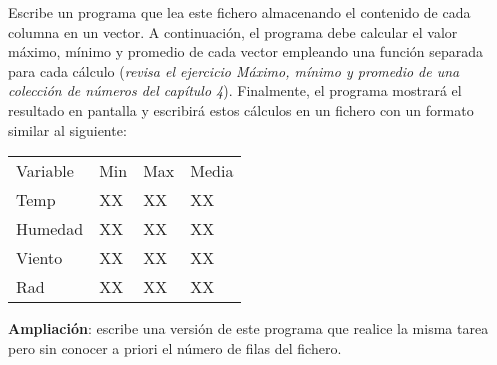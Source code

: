 \documentclass[a4paper]{article}
\begin{document}
Escribe un programa que lea este fichero almacenando el contenido de cada columna en un vector. A continuación, el programa debe calcular el valor máximo, mínimo y promedio de cada vector empleando una función separada para cada cálculo (\emph{revisa el ejercicio \guillemotleft{}Máximo, mínimo y promedio de una colección de números\guillemotright{} del capítulo 4}). Finalmente, el programa mostrará el resultado en pantalla y escribirá estos cálculos en un fichero con un formato similar al siguiente:

\begin{center}
\begin{tabular}{llll}
Variable & Min & Max & Media\\
Temp & XX & XX & XX\\
Humedad & XX & XX & XX\\
Viento & XX & XX & XX\\
Rad & XX & XX & XX\\
\end{tabular}
\end{center}



\textbf{Ampliación}: escribe una versión de este programa que realice la misma tarea pero sin conocer a priori el número de filas del fichero.
\end{document}
